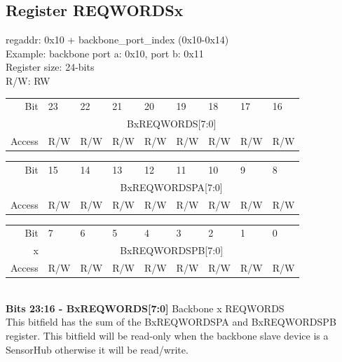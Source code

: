 \documentclass{article}
\begin{document}
\subsection{Register REQWORDSx}
regaddr: 0x10 + backbone\_port\_index (0x10-0x14)\\
Example: backbone port a: 0x10, port b: 0x11\\
Register size: 24-bits\\
R/W: RW\\
\begin{table}[h!]
    \centering
\begin{tabular}{rp{1.25cm}p{1.25cm}p{1.25cm}p{1.25cm}p{1.25cm}p{1.25cm}p{1.25cm}p{1.25cm}}
Bit &
  23 &
  22 &
  21 &
  20 &
  19 &
  18 &
  17 &
  16 \\ \cline{2-9} 
\multicolumn{1}{r|}{} &
 \multicolumn{8}{c|}{\scriptsize{BxREQWORDS[7:0]}} \\\cline{2-9} 
Access &
  R/W &
  R/W &
  R/W &
  R/W &
  R/W &
  R/W &
  R/W &
  R/W 
\end{tabular}
\begin{tabular}{rp{1.25cm}p{1.25cm}p{1.25cm}p{1.25cm}p{1.25cm}p{1.25cm}p{1.25cm}p{1.25cm}}
Bit &
  15 &
  14 &
  13 &
  12 &
  11 &
  10 &
  9 &
  8 \\ \cline{2-9} 
\multicolumn{1}{r|}{} &
  \multicolumn{8}{c|}{\scriptsize{BxREQWORDSPA[7:0]}}  \\\cline{2-9} 
Access &
  R/W &
  R/W &
  R/W &
  R/W &
  R/W &
  R/W &
  R/W &
  R/W 
\end{tabular}

\begin{tabular}{rp{1.25cm}p{1.25cm}p{1.25cm}p{1.25cm}p{1.25cm}p{1.25cm}p{1.25cm}p{1.25cm}}
Bit &
  7 &
  6 &
  5 &
  4 &
  3 &
  2 &
  1 &
  0 \\ \cline{2-9} 

\multicolumn{1}{r|}{x} &
  \multicolumn{8}{c|}{\scriptsize{BxREQWORDSPB[7:0]}}  \\\cline{2-9} 
  
Access &
  R/W &
  R/W &
  R/W &
  R/W &
  R/W &
  R/W &
  R/W &
  R/W 
\end{tabular}
\end{table}\\
\textbf{Bits 23:16 - BxREQWORDS[7:0]} Backbone x REQWORDS\\
This bitfield has the sum of the BxREQWORDSPA and BxREQWORDSPB register. This bitfield will be read-only when the backbone slave device is a SensorHub otherwise it will be read/write.\\\\
\end{document}
